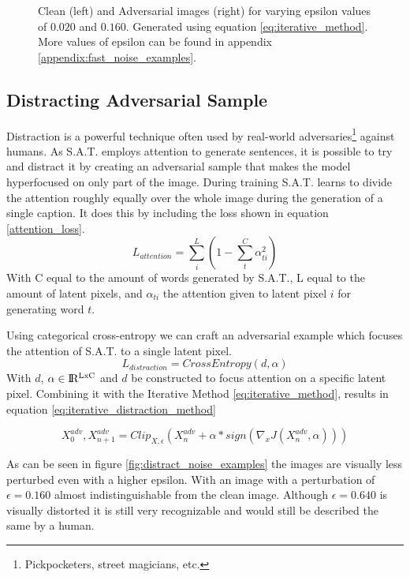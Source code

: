 \begin{figure}[h]
{    }
    \caption{Clean (left) and Adversarial images (right) for varying epsilon values of $0.020$ and $0.160$. Generated using equation \ref{eq:iterative_method}. More values of epsilon can be found in appendix \ref{appendix:fast_noise_examples}.}
    \label{fig:iterative_noise_examples}
\end{figure}


\subsection*{Distracting Adversarial Sample}
Distraction is a powerful technique often used by real-world adversaries\footnote[1]{Pickpocketers, street magicians, etc.} against humans. As S.A.T. employs attention to generate sentences, it is possible to try and distract it by creating an adversarial sample that makes the model hyperfocused on only part of the image. During training S.A.T. learns to divide the attention roughly equally over the whole image during the generation of a single caption. It does this by including the loss shown in equation \ref{attention_loss}.
\begin{equation}
    L_{attention} = \sum^{L}_i (1 - \sum^{C}_{t} \alpha_{ti}^2)
    \label{attention_loss}
\end{equation}
\noindent With C equal to the amount of words generated by S.A.T., L equal to the amount of latent pixels, and $\alpha_{ti}$ the attention given to latent pixel $i$ for generating word $t$.

Using categorical cross-entropy we can craft an adversarial example which focuses the attention of S.A.T. to a single latent pixel.
\begin{equation}
    L_{distraction} = CrossEntropy(d, \alpha)
    \label{distraction_loss}
\end{equation}
With $d$, $\alpha \in \rm I\!R^{LxC}$ and $d$ be constructed to focus attention on a specific latent pixel. Combining it with the Iterative Method \ref{eq:iterative_method}, results in equation \ref{eq:iterative_distraction_method}

\begin{equation}
    X^{adv}_{0}, X^{adv}_{n + 1} = Clip_{X, \epsilon}(X^{adv}_{n} + \alpha * sign(\nabla_{x}J(X^{adv}_{n}, \alpha)))
    \label{eq:iterative_distraction_method}
\end{equation}

As can be seen in figure \ref{fig:distract_noise_examples} the images are visually less perturbed even with a higher epsilon. With an image with a perturbation of $\epsilon=0.160$ almost indistinguishable from the clean image. Although $\epsilon=0.640$ is visually distorted it is still very recognizable and would still be described the same by a human.

